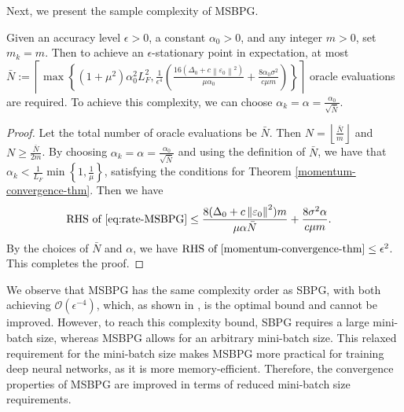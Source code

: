 \documentclass[twoside,11pt]{article}
\newcommand{\floor}[1]{\left\lfloor#1\right\rfloor}
\newcommand{\ceil}[1]{\left\lceil#1\right\rceil}
\def\norm#1{\left\|#1\right\|}
\begin{document}
Next, we present the sample complexity of MSBPG.
{
\begin{corollary}
\label{cor:complexity-MSBPG}
Given an accuracy level $\epsilon>0$, a constant $\alpha_0>0$, and any integer $m>0$, set $m_k=m$. Then to achieve an $\epsilon$-stationary point in expectation, at most $\bar N:=\ceil{\max\left\{(1+\mu^2)\alpha_0^2L_F^2,\frac{1}{\epsilon^4}\left(\frac{16(\Delta_0+c\norm{\varepsilon_0}^2)}{\mu\alpha_0}+\frac{8\alpha_0\sigma^2}{c\mu m}\right)\right\}}$ oracle evaluations are required. To achieve this complexity, we can choose $\alpha_k=\alpha=\frac{\alpha_0}{\sqrt{\bar N}}$.
\end{corollary}
\begin{proof}
Let the total number of oracle evaluations be $\bar N$. Then $N=\floor{\frac{\bar N}{m}}$ and $N\geq\frac{\bar N}{2m}$. By choosing $\alpha_k=\alpha=\frac{\alpha_0}{\sqrt{\bar N}}$ and using the definition of $\bar N$, we have that $\alpha_k<\frac{1}{L_F}\min\left\{1,\frac{1}{\mu}\right\}$, satisfying the conditions for Theorem \ref{momentum-convergence-thm}. Then we have
\[
\begin{aligned}
 \text{RHS of }\eqref{eq:rate-MSBPG}  \leq \; &\frac{8(\Delta_0+c\norm{\varepsilon_0}^2)m}{\mu\alpha\bar N}+\frac{8\sigma^2\alpha}{c\mu m}.
\end{aligned}
\]
By the choices of $\bar N$ and $\alpha$, we have $\text{RHS of }\eqref{momentum-convergence-thm}\leq\epsilon^2$. This completes the proof.
\end{proof} }
{We observe that MSBPG has the same complexity order as SBPG, with both achieving $\mathcal{O}(\epsilon^{-4})$, which, as shown in \citep{arjevani2023lower}, is the optimal bound and cannot be improved. However, to reach this complexity bound, SBPG requires a large mini-batch size, whereas MSBPG allows for an arbitrary mini-batch size. This relaxed requirement for the mini-batch size makes MSBPG more practical for training deep neural networks, as it is more memory-efficient. Therefore, the convergence properties of MSBPG are improved in terms of reduced mini-batch size requirements.}
\end{document}

